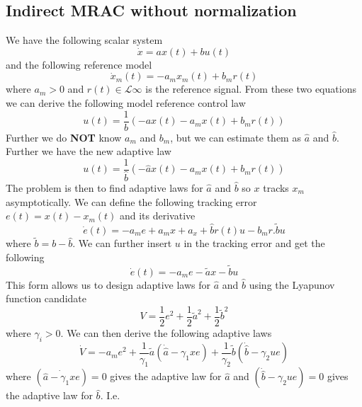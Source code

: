 \documentclass[10pt]{article}
\begin{document}
\begin{multicols*}{2}
 \subsection{Indirect MRAC without normalization}
 We have the following scalar system
 \begin{equation*}
    \dot x = a x(t) + b u(t)
 \end{equation*}
 and the following reference model
 \begin{equation*}
    \dot x_m (t) = -a_m x_m(t) + b_m r(t)
 \end{equation*} 
 where $a_m > 0$  and $r(t) \in  \mathcal{L}{\infty}$ is the reference signal. From these two equations we can derive the following model reference control law
 \begin{equation*}
    u(t) = \frac{1}{b}(-a x(t) - a_m x(t) + b_m r(t))
 \end{equation*}
Further we do \textbf{NOT} know $a_m$ and $b_m$, but we can estimate them as $\hat{a}$ and $\hat{b}$. Further we have the new adaptive law
\begin{equation*}
    u(t) = \frac{1}{\hat{b}}(- \hat{a} x(t) - a_m x(t) + b_m r(t))
\end{equation*}
The problem is then to find adaptive laws for $\hat{a}$ and $\hat{b}$ so $x$ tracks $x_m$ asymptotically. We can define the following tracking error $e(t) = x(t) - x_m(t)$ and its derivative
\begin{equation*}
    \dot e(t) = -a_m e + a_m x + a_x + \hat{b} r(t) u - b_m r . \tilde{b} u
\end{equation*}
where $\tilde{b} = b - \hat{b}$. We can further insert $u$ in the tracking error and get the following
\begin{equation*}
    \dot e(t) = -a_m e - \tilde{a} x - \tilde{b}u
\end{equation*}
This form allows us to design adaptive laws for $\hat{a}$ and $\hat{b}$ using the Lyapunov function candidate
\begin{equation*}
    V = \frac{1}{2} e^2 + \frac{1}{2} \tilde{a}^2 + \frac{1}{2} \tilde{b}^2
\end{equation*}
where $\gamma_i > 0$. We can then derive the following adaptive laws
\begin{equation*}
    \dot V = -a_m e ^2 + \frac{1}{\gamma_1} \tilde{a} (\dot{\hat{a}} - \gamma_1 x e) + \frac{1}{\gamma_2} \tilde{b} (\dot{\hat{b}} - \gamma_2 u e)
\end{equation*}
where $(\dot{\hat{a} - \gamma_1 x e}) = 0$ gives the adaptive law for $\hat{a} $ and $(\dot{\hat{b}} - \gamma_2 u e) = 0$ gives the adaptive law for $\hat{b}$. I.e.

\end{multicols*}
\end{document}
